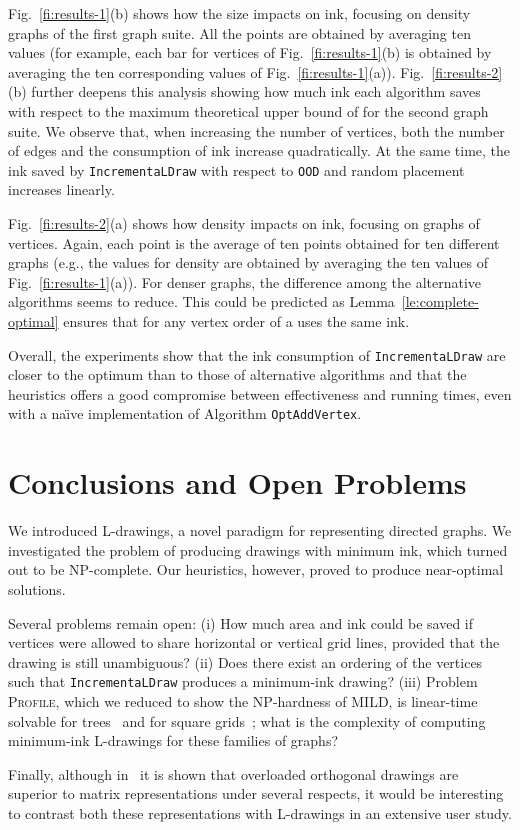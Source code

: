 \documentclass{llncs}
\begin{document}
Fig.~\ref{fi:results-1}(b) shows how the size impacts on ink, focusing on  density graphs of the first graph suite. All the points are obtained by averaging ten values (for example, each bar for  vertices of Fig.~\ref{fi:results-1}(b) is obtained by averaging the ten corresponding values of Fig.~\ref{fi:results-1}(a)). 
Fig.~\ref{fi:results-2}(b) further deepens this analysis showing how much ink each algorithm saves with respect to the maximum theoretical upper bound of  for the second graph suite.
We observe that, when increasing the number of vertices, both the number of edges and the consumption of ink increase quadratically. At the same time, the ink saved by \texttt{IncrementaLDraw} with respect to \texttt{OOD} and random placement increases linearly.

Fig.~\ref{fi:results-2}(a) shows how density impacts on ink, focusing on graphs of  vertices. Again, each point is the average of ten points obtained for ten different graphs (e.g., the values for density  are obtained by averaging the ten values of Fig.~\ref{fi:results-1}(a)). For denser graphs, the difference among the alternative algorithms seems to reduce. This could be predicted as Lemma~\ref{le:complete-optimal} ensures that for any vertex order of a  uses the same ink.

Overall, the experiments show that the ink consumption of \texttt{IncrementaLDraw} are closer to the optimum than to those of alternative algorithms and that the heuristics offers a good compromise between effectiveness and running times, even with a na\"{\i}ve implementation of Algorithm \texttt{OptAddVertex}. 




\section{Conclusions and Open Problems}\label{se:conclusions}

We introduced L-drawings, a novel paradigm for representing directed graphs. We investigated the problem of producing drawings with minimum ink, which turned out to be NP-complete. Our heuristics, however, proved to produce near-optimal solutions. 

Several problems remain open: (i) How much area and ink could be saved if vertices were allowed to share horizontal or vertical grid lines, provided that the drawing is still unambiguous?
(ii) Does there exist an ordering of the vertices such that \texttt{IncrementaLDraw} produces a minimum-ink drawing? (iii) Problem \textsc{Profile}, which we reduced to show the NP-hardness of \textsc{MILD}, is linear-time solvable for trees~\cite{dgpt-mp-91} and for square grids~\cite{dpps-ctslm-00}; what is the complexity of computing minimum-ink L-drawings for these families of graphs? 

Finally, although in~\cite{dmpt-hvdgu-14} it is shown that overloaded orthogonal drawings are superior to matrix representations under several respects, it would be interesting to contrast both these representations with L-drawings in an extensive user study.




\end{document}
